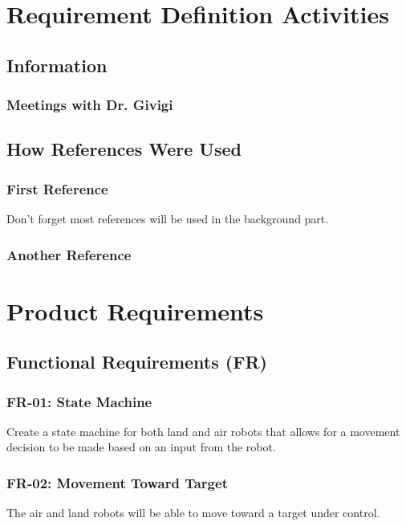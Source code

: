 \documentclass[]{report}
\begin{document}
\chapter{Requirement Definition Activities}

\section{Information}

\subsection{Meetings with Dr. Givigi}

\section{How References Were Used}

\subsection{First Reference}
Don't forget most references will be used in the background part. 

\subsection{Another Reference}


\chapter{Product Requirements}

\section{Functional Requirements (FR)}

\subsection{FR-01: State Machine}
Create a state machine for both land and air robots that allows for a movement decision to be made based on an input from the robot. 

\subsection{FR-02: Movement Toward Target}
The air and land robots will be able to move toward a target under control.
\end{document}
